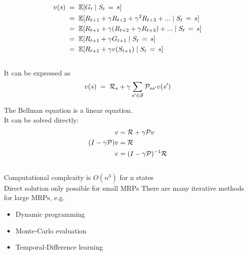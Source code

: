 \documentclass[landscape]{article}
\def\tcb{\textcolor{blue}}
\begin{document}
\begin{multline}\notag
    \begin{aligned}
    v(s)&\;=\;\mathbb{E}[G_t \;|\; S_t\,=\,s]\\
    &\;=\;\mathbb{E}[R_{t+1}+{\gamma}R_{t+2}+{\gamma}^2 R_{t+3} + ... \;|\; S_t\,=\,s]\\
    &\;=\;\mathbb{E}[R_{t+1}+{\gamma}(R_{t+2}+{\gamma} R_{t+3}) + ... \;|\; S_t\,=\,s]\\
    &\;=\;\mathbb{E}[R_{t+1}+{\gamma}G_{t+1} \;|\; S_t\,=\,s]\\
    &\;=\;\mathbb{E}[R_{t+1}+{\gamma}v(S_{t+1}) \;|\; S_t\,=\,s]
    \end{aligned}
\end{multline}\\
\vspace{0.5cm}
It can be expressed as
\begin{equation}\notag
v(s) \;=\;\mathcal{R}_s +{\gamma}\sum\limits_{s' \in \mathcal{S}} \mathcal{P}_{ss'} v(s')
\end{equation}

\newpage
\newvgtitle{\tcb{Solving the Bellman Equation}}
\LARGE
\vspace{-.5em}
\vspace{0.5cm}
The Bellman equation is a linear equation.\\
It can be solved directly:
\begin{multline}\notag
    \begin{aligned}
    &v= \mathcal{R}+{\gamma}\mathcal{P}v\\
    (I-{\gamma}\mathcal{P})&v = \mathcal{R}\\
    &v =  (I-{\gamma}\mathcal{P})^{-1} \mathcal{R}
    \end{aligned}
\end{multline}\\
\vspace{0.5cm}
Computational complexity is $O(n^3)$ for n states\\
\vspace{0.5cm}
Direct solution only possible for small MRPs
There are many iterative methods for large MRPs, e.g.
\begin{itemize}
    \item Dynamic programming
    \item Monte-Carlo evaluation
    \item Temporal-Difference learning
\end{itemize}
\vspace{0.5cm}
\end{document}
